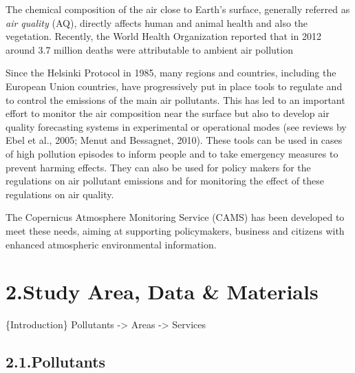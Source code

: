 \documentclass[9pt]{article}
\begin{document}
\noindent{}The chemical composition of the air close to Earth’s surface, generally referred as \emph{air quality} (AQ), directly affects human and animal health and also the vegetation. 
Recently, the World Health Organization reported that in 2012 around 3.7 million deaths were attributable to ambient air pollution %

Since the Helsinki Protocol in 1985, many regions and countries, including the European Union countries, have progressively put in place tools to regulate and to control the emissions of the main air pollutants. 
This has led to an important effort to monitor the air composition near the surface but also to develop air quality forecasting systems in experimental or operational modes (see reviews by Ebel et al., 2005; Menut and Bessagnet, 2010).
These tools can be used in cases of high pollution episodes to inform people and to take emergency measures to prevent harming effects. 
They can also be used for policy makers for the regulations on air pollutant emissions and for monitoring the effect of these regulations on air quality.%

The Copernicus Atmosphere Monitoring Service (CAMS) 
has been developed to meet these needs, aiming at supporting policymakers, 
business and citizens with enhanced atmospheric environmental information.%

\section{2.\hspace*{0.5em}Study Area, Data \& Materials}\label{sec-study-area-data-materials}%

\noindent{}\{Introduction\}
Pollutants -\textgreater{} Areas -\textgreater{} Services%

\subsection{2.1.\hspace*{0.5em}Pollutants}\label{sec-pollutants}%
\end{document}
